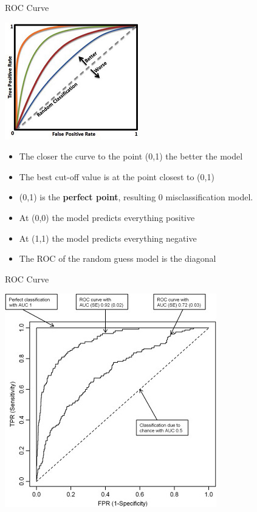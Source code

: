 \documentclass[
  ignorenonframetext,
]{beamer}
\providecommand{\tightlist}{%
  \setlength{\itemsep}{0pt}\setlength{\parskip}{0pt}}
\begin{document}
\begin{frame}{ROC Curve}
\protect\hypertarget{roc-curve-2}{}

\includegraphics{images/roc2.png}

\begin{itemize}
\tightlist
\item
  The closer the curve to the point (0,1) the better the model
\item
  The best cut-off value is at the point closest to (0,1)
\item
  (0,1) is the \textbf{perfect point}, resulting 0 misclassification
  model.\\
\item
  At (0,0) the model predicts everything positive
\item
  At (1,1) the model predicts everything negative
\item
  The ROC of the random guess model is the diagonal
\end{itemize}

\end{frame}

\begin{frame}{ROC Curve}
\protect\hypertarget{roc-curve-3}{}

\includegraphics{images/roc3.jpg}

\end{frame}
\end{document}
